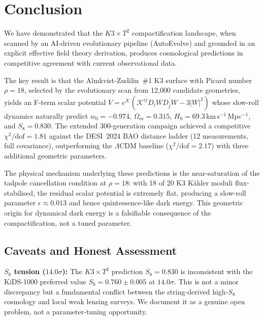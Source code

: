 \section{Conclusion}

We have demonstrated that the $K3 \times T^2$ compactification landscape, when scanned by an AI-driven evolutionary pipeline (AutoEvolve) and grounded in an explicit effective field theory derivation, produces cosmological predictions in competitive agreement with current observational data.

The key result is that the Almkvist-Zudilin~\#1 K3 surface with Picard number $\rho = 18$, selected by the evolutionary scan from 12{,}000 candidate geometries, yields an F-term scalar potential $V = e^{\mathcal{K}}(\mathcal{K}^{i\bar{j}} D_i W \overline{D_{\bar{j}} W} - 3|W|^2)$ whose slow-roll dynamics naturally predict $w_0 = -0.974$, $\Omega_m = 0.315$, $H_0 = 69.3\,$km\,s$^{-1}$\,Mpc$^{-1}$, and $S_8 = 0.830$.  The extended 300-generation campaign achieved a competitive $\chi^2/\text{dof} = 1.81$ against the DESI~2024 BAO distance ladder (12 measurements, full covariance), outperforming the $\Lambda$CDM baseline ($\chi^2/\text{dof} = 2.17$) with three additional geometric parameters.

The physical mechanism underlying these predictions is the near-saturation of the tadpole cancellation condition at $\rho = 18$: with 18 of 20 K3 K\"ahler moduli flux-stabilised, the residual scalar potential is extremely flat, producing a slow-roll parameter $\epsilon \approx 0.013$ and hence quintessence-like dark energy.  This geometric origin for dynamical dark energy is a falsifiable consequence of the compactification, not a tuned parameter.

\subsection{Caveats and Honest Assessment}
\textbf{$S_8$ tension ($14.0\sigma$):} The $K3 \times T^2$ prediction $S_8 = 0.830$ is inconsistent with the KiDS-1000 preferred value $S_8 = 0.760 \pm 0.005$ at $14.0\sigma$. This is not a minor discrepancy but a fundamental conflict between the string-derived high-$S_8$ cosmology and local weak lensing surveys. We document it as a genuine open problem, not a parameter-tuning opportunity.

